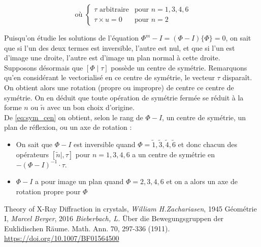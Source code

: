 \documentclass{cours}
\begin{document}
\begin{equation}
    [\tilde{n} \mid \tau] \text{ où } \begin{cases}
        \tau \text{ arbitraire} & \text{pour } n = 1, 3, 4, 6\\
        \tau\times u = 0 & \text{pour } n = 2
    \end{cases}
\end{equation}

Puisqu'on étudie les solutions de l'équation $\Phi^{m} - I = (\Phi - I)\{\Phi\} = 0$, on sait que si l'un des deux termes est inversible, l'autre est nul, et que si l'un est d'image une droite, l'autre est d'image un plan normal à cette droite. \\
Supposons désormais que $\left[\Phi \mid \tau\right]$ possède un centre de symétrie. Remarquons qu'en considérant le vectorialisé en ce centre de symétrie, le vecteur $\tau$ disparaît. On obtient alors une rotation (propre ou impropre) de centre ce centre de symétrie. On en déduit que toute opération de symétrie fermée se réduit à la forme $n$ ou $\tilde{n}$ avec un bon choix d'origine.\\
De \ref{eq:sym_cen} on obtient, selon le rang de $\Phi - I$, un centre de symétrie, un plan de réflexion, ou un axe de rotation : 
\begin{itemize}
    \item On sait que $\Phi -I$ est inversible quand $\Phi = \tilde{1}, \tilde{3}, \tilde{4}, \tilde{6}$ et donc chacun des opérateurs $\left[\tilde{n} \mid, \tau\right]$ pour $n = 1, 3, 4, 6$ a un centre de symétrie en $-\left(\Phi - I\right)^{-1} \cdot \tau$. 
    \item $\Phi - I$ a pour image un plan quand $\Phi = 2, 3, 4, 6$ et on a alors un axe de rotation propre pour $\Phi$
\end{itemize}




\begin{thebibliography}{}
     Theory of X-Ray Diffraction in crystals, \textit{William H.Zachariasen}, 1945
     Géométrie I, \textit{Marcel Berger}, 2016
     \textit{Bieberbach, L.} Über die Bewegungsgruppen der Euklidischen Räume. Math. Ann. 70, 297-336 (1911). \href{https://doi.org/10.1007/BF01564500}{https://doi.org/10.1007/BF01564500}
\end{thebibliography}
\end{document}
